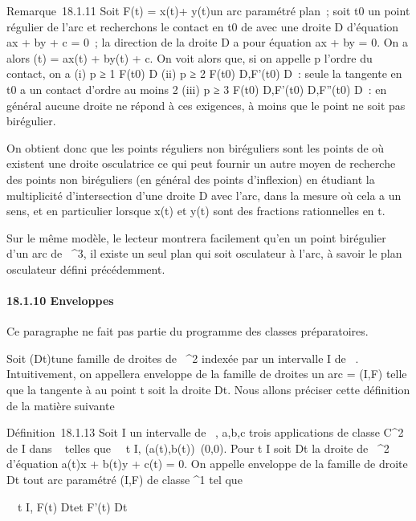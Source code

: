 Remarque~18.1.11 Soit F(t) = x(t)\vec\imath +
y(t) un arc paramétré plan~; soit t0
un point régulier de l'arc et recherchons le contact en t0 de
\Gamma avec une droite D d'équation ax + by + c = 0~; la direction
\vecD de la droite D a pour équation ax + by = 0. On
a alors \phi(t) = ax(t) + by(t) + c. On voit alors que, si on appelle p
l'ordre du contact, on a (i) p ≥ 1 \Leftrightarrow
F(t0) \in D (ii) p ≥ 2 \Leftrightarrow
F(t0) \in D,F'(t0) \in\vec D~: seule
la tangente en t0 a un contact d'ordre au moins 2 (iii) p ≥ 3
\Leftrightarrow F(t0) \in D,F'(t0)
\in\vec D,F''(t0) \in\vec
D~: en général aucune droite ne répond à ces exigences, à moins que le
point ne soit pas birégulier.

On obtient donc que les points réguliers non biréguliers sont les points
de \Gamma où existent une droite osculatrice ce qui peut fournir un autre
moyen de recherche des points non biréguliers (en général des points
d'inflexion) en étudiant la multiplicité d'intersection d'une droite D
avec l'arc, dans la mesure où cela a un sens, et en particulier lorsque
x(t) et y(t) sont des fractions rationnelles en t.

Sur le même modèle, le lecteur montrera facilement qu'en un point
birégulier d'un arc de ~^3, il existe un seul plan qui soit
osculateur à l'arc, à savoir le plan osculateur défini précédemment.

\paragraph{18.1.10 Enveloppes}

Ce paragraphe ne fait pas partie du programme des classes préparatoires.

Soit (Dt)t\inI une famille de droites de
~^2 indexée par un intervalle I de ~. Intuitivement, on
appellera enveloppe de la famille de droites un arc \Gamma = (I,F) telle que
la tangente à \Gamma au point t soit la droite Dt. Nous allons
préciser cette définition de la matière suivante

Définition~18.1.13 Soit I un intervalle de ~, a,b,c trois applications
de classe C^2 de I dans ~ telles que
\forall~~t \in I,
(a(t),b(t))\neq~(0,0). Pour t \in I soit
Dt la droite de ~^2 d'équation a(t)x + b(t)y + c(t)
= 0. On appelle enveloppe de la famille de droite Dt tout arc
paramétré (I,F) de classe ^1 tel que

\forall~~t \in I, F(t) \in
Dt\text et F'(t)
\in\overrightarrow Dt

